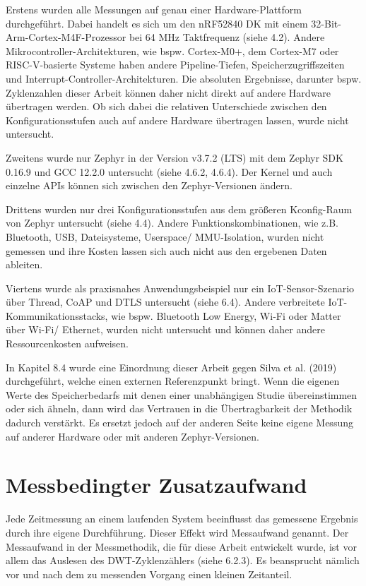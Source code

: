 Erstens wurden alle Messungen auf genau einer Hardware-Plattform durchgef{\"u}hrt. Dabei handelt es sich um den nRF52840 DK mit einem 32-Bit-Arm-Cortex-M4F-Prozessor bei 64 MHz Taktfrequenz (siehe 4.2). Andere Mikrocontroller-Architekturen, wie bspw. Cortex-M0+, dem Cortex-M7 oder RISC-V-basierte Systeme haben andere Pipeline-Tiefen, Speicherzugriffszeiten und Interrupt-Controller-Architekturen. Die absoluten Ergebnisse, darunter bspw. Zyklenzahlen dieser Arbeit k{\"o}nnen daher nicht direkt auf andere Hardware {\"u}bertragen werden. Ob sich dabei die relativen Unterschiede zwischen den Konfigurationsstufen auch auf andere Hardware {\"u}bertragen lassen, wurde nicht untersucht.

Zweitens wurde nur Zephyr in der Version v3.7.2 (LTS) mit dem Zephyr SDK 0.16.9 und GCC 12.2.0 untersucht (siehe 4.6.2, 4.6.4). Der Kernel und auch einzelne APIs k{\"o}nnen sich zwischen den Zephyr-Versionen {\"a}ndern.

Drittens wurden nur drei Konfigurationsstufen aus dem gr{\"o}{\ss}eren Kconfig-Raum von Zephyr untersucht (siehe 4.4). Andere Funktionskombinationen, wie z.B. Bluetooth, USB, Dateisysteme, Userspace/ MMU-Isolation, wurden nicht gemessen und ihre Kosten lassen sich auch nicht aus den ergebenen Daten ableiten.

Viertens wurde als praxisnahes Anwendungsbeispiel nur ein IoT-Sensor-Szenario {\"u}ber Thread, CoAP und DTLS untersucht (siehe 6.4). Andere verbreitete IoT-Kommunikationsstacks, wie bspw. Bluetooth Low Energy, Wi-Fi oder Matter {\"u}ber Wi-Fi/ Ethernet, wurden nicht untersucht und k{\"o}nnen daher andere Ressourcenkosten aufweisen.

In Kapitel 8.4 wurde eine Einordnung dieser Arbeit gegen Silva et al. (2019) durchgef{\"u}hrt, welche einen externen Referenzpunkt bringt. Wenn die eigenen Werte des Speicherbedarfs mit denen einer unabh{\"a}ngigen Studie {\"u}bereinstimmen oder sich {\"a}hneln, dann wird das Vertrauen in die {\"U}bertragbarkeit der Methodik dadurch verst{\"a}rkt. Es ersetzt jedoch auf der anderen Seite keine eigene Messung auf anderer Hardware oder mit anderen Zephyr-Versionen.

\section{Messbedingter Zusatzaufwand}
Jede Zeitmessung an einem laufenden System beeinflusst das gemessene Ergebnis durch ihre eigene Durchf{\"u}hrung. Dieser Effekt wird Messaufwand genannt. Der Messaufwand in der Messmethodik, die f{\"u}r diese Arbeit entwickelt wurde, ist vor allem das Auslesen des DWT-Zyklenz{\"a}hlers (siehe 6.2.3). Es beansprucht n{\"a}mlich vor und nach dem zu messenden Vorgang einen kleinen Zeitanteil.


